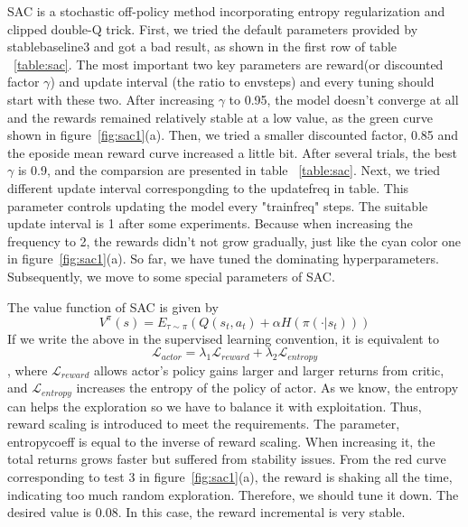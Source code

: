 \documentclass[letterpaper,11pt]{article}
\begin{document}
SAC is a stochastic off-policy method incorporating entropy regularization and clipped double-Q trick.
First, we tried the default parameters provided by stable\textunderscore baseline3 and got a bad result, 
as shown in the first row of table ~\ref{table:sac}. 
The most important two key parameters are reward(or discounted factor $\gamma$) and update interval (the ratio to 
env\textunderscore steps) and every tuning should start with these two. After increasing $\gamma$ to 0.95, 
the model doesn't converge at all and the rewards remained relatively stable at a low value, as the green curve shown in 
figure~\ref{fig:sac1}(a). Then, we tried a smaller discounted factor, 0.85 and the eposide mean reward curve 
increased a little bit. After several trials, the best $\gamma$ is 0.9, and the comparsion are presented in 
table ~\ref{table:sac}. Next, we tried different update interval correspongding to the update\textunderscore freq in table.
This parameter controls updating the model every "train\textunderscore freq" steps. 
The suitable update interval is 1 after some experiments. Because when increasing the frequency to 2, the 
rewards didn't not grow gradually, just like the cyan color one in figure~\ref{fig:sac1}(a). So far, we have
tuned the dominating hyperparameters. Subsequently, we move to some special parameters of SAC.

The value function of SAC is given by 
\begin{equation}
  V^{\pi}(s) = E_{\tau \sim \pi}(Q(s_t,a_t) + \alpha H(\pi( \cdot | s_t))) \nonumber
\end{equation}
If we write the above in the supervised learning convention, it is equivalent to 
\begin{equation}
  \mathcal{L}_{actor} = \lambda_1 \mathcal{L}_{reward} + \lambda_2 \mathcal{L}_{entropy} \nonumber
\end{equation}
, where $\mathcal{L}_{reward}$ allows actor's policy gains larger and larger returns from critic, and 
$\mathcal{L}_{entropy}$ increases the entropy of the policy of actor. As we know, the entropy can helps the exploration
so we have to balance it with exploitation. Thus, reward scaling is introduced to meet the requirements. The parameter,
entropy\textunderscore coeff is equal to the inverse of reward scaling. When increasing it, the total returns grows faster
but suffered from stability issues. From the red curve corresponding to test 3 in figure~\ref{fig:sac1}(a), the reward
is shaking all the time, indicating too much random exploration. Therefore, we should tune it down. The desired value
is 0.08. In this case, the reward incremental is very stable.
\end{document}
